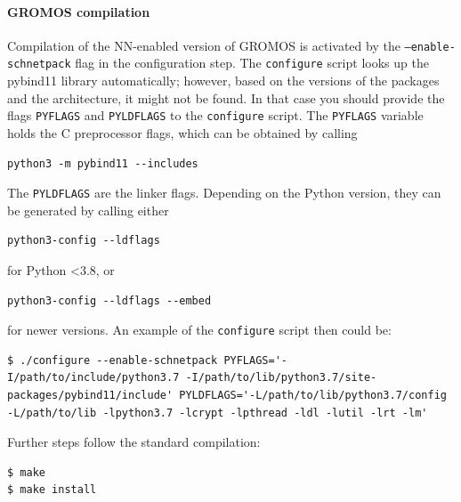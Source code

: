 \paragraph{GROMOS compilation}
Compilation of the NN-enabled version of GROMOS is activated by the \texttt{--enable-schnetpack} flag in the configuration step. The \texttt{configure} script looks up the pybind11 library automatically; however, based on the versions of the packages and the architecture, it might not be found. In that case you should provide the flags \texttt{PYFLAGS} and \texttt{PYLDFLAGS} to the \texttt{configure} script. The \texttt{PYFLAGS} variable holds the C preprocessor flags, which can be obtained by calling

\begin{lstlisting}[breaklines=true, breakatwhitespace=false]
python3 -m pybind11 --includes
\end{lstlisting}

The \texttt{PYLDFLAGS} are the linker flags. Depending on the Python version, they can be generated by calling either 

\begin{lstlisting}[breaklines=true, breakatwhitespace=false]
python3-config --ldflags
\end{lstlisting}

for Python <3.8, or 

\begin{lstlisting}[breaklines=true, breakatwhitespace=false]
python3-config --ldflags --embed
\end{lstlisting}

for newer versions. An example of the \texttt{configure} script then could be:
\begin{lstlisting}[breaklines=true, breakatwhitespace=false, showstringspaces=false]
$ ./configure --enable-schnetpack PYFLAGS='-I/path/to/include/python3.7 -I/path/to/lib/python3.7/site-packages/pybind11/include' PYLDFLAGS='-L/path/to/lib/python3.7/config -L/path/to/lib -lpython3.7 -lcrypt -lpthread -ldl -lutil -lrt -lm'
\end{lstlisting}

Further steps follow the standard compilation:
\begin{lstlisting}[breaklines=true, breakatwhitespace=false]
$ make
$ make install
\end{lstlisting}


